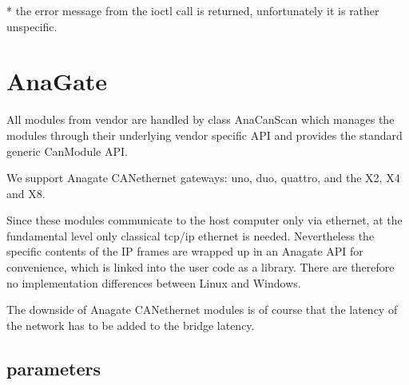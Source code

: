 \documentclass[a4paper,10pt,english]{sphinxmanual}
\begin{document}
\sphinxAtStartPar
{}
* the error message from the ioctl call is returned, unfortunately it is rather unspecific.


\chapter{AnaGate}
\label{\detokenize{vendors/anagate:anagate}}\label{\detokenize{vendors/anagate::doc}}
\sphinxAtStartPar
All modules from vendor {\hyperref[\detokenize{vendors/anagate:anagate}]{}} are handled by class AnaCanScan which manages the modules through their underlying vendor specific API and provides
the standard generic CanModule API.

\sphinxAtStartPar
We support Anagate CAN\sphinxhyphen{}ethernet gateways: uno, duo, quattro, and the X2, X4 and X8.

\sphinxAtStartPar
Since these modules communicate to the host computer only via ethernet, at the fundamental level only classical
tcp/ip ethernet is needed. Nevertheless the specific contents of the IP frames are wrapped up in an Anagate API for convenience, which is linked
into the user code as a library. There are therefore no implementation differences between Linux and Windows.

\sphinxAtStartPar
The downside of Anagate CAN\sphinxhyphen{}ethernet modules is of course that the latency of the network has to be added to the bridge latency.


\section{parameters}
\label{\detokenize{vendors/anagate:parameters}}
\end{document}
